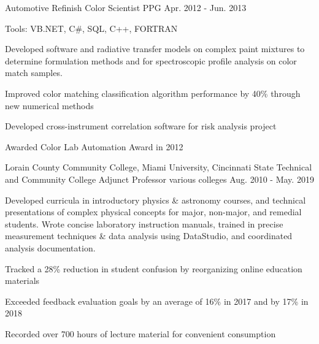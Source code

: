 \begin{cventries}
  \cvexpentry
    {Automotive Refinish} %
    {Color Scientist} %
    {PPG} %
    {Apr. 2012 - Jun. 2013}
    {
      \begin{cvheavyparagraph}
        Tools: VB.NET, C\#, SQL, C++, FORTRAN
      \end{cvheavyparagraph}
    }
    {
      \begin{cvparagraph}
        Developed software and radiative transfer models on complex paint mixtures to determine formulation methods and for spectroscopic profile analysis on color match samples.
      \end{cvparagraph}
      \begin{cvitems} %
        \item {Improved color matching classification algorithm performance by 40\% through new numerical methods}
        \item {Developed cross-instrument correlation software for risk analysis project}
        \item {Awarded Color Lab Automation Award in 2012}
      \end{cvitems}
    }

  \cventry
    {Lorain County Community College, Miami University, Cincinnati State Technical and Community College} %
    {Adjunct Professor} %
    {various colleges} %
    {Aug. 2010 - May. 2019} %
    {
      \begin{cvparagraph}
        Developed curricula in introductory physics \& astronomy courses, and technical presentations of complex physical concepts for major, non-major, and remedial students.  Wrote concise laboratory instruction manuals, trained in precise measurement techniques \& data analysis using DataStudio, and coordinated analysis documentation.
      \end{cvparagraph}
      \begin{cvitems} %
        \item {Tracked a 28\% reduction in student confusion by reorganizing online education materials}
        \item {Exceeded feedback evaluation goals by an average of 16\% in 2017 and by 17\% in 2018}
        \item {Recorded over 700 hours of lecture material for convenient consumption}
      \end{cvitems}
    }


\end{cventries}
